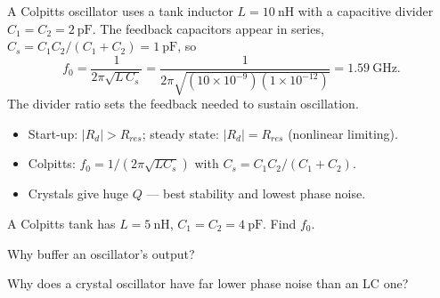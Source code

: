 \begin{workedexample}
A Colpitts oscillator uses a tank inductor $L = 10\ \text{nH}$ with a
capacitive divider $C_1 = C_2 = 2\ \text{pF}$. The feedback capacitors appear in
series, $C_s = C_1C_2/(C_1+C_2) = 1\ \text{pF}$, so
\[ f_0 = \frac{1}{2\pi\sqrt{L\,C_s}} = \frac{1}{2\pi\sqrt{(10\times10^{-9})(1\times10^{-12})}} = 1.59\ \text{GHz}. \]
The divider ratio sets the feedback needed to sustain oscillation.
\end{workedexample}

\begin{keytakeaways}
\begin{itemize}[leftmargin=1.4em,itemsep=2pt]
\item Start-up: $|R_d| > R_{res}$; steady state: $|R_d| = R_{res}$ (nonlinear limiting).
\item Colpitts: $f_0 = 1/(2\pi\sqrt{L C_s})$ with $C_s = C_1C_2/(C_1+C_2)$.
\item Crystals give huge $Q$ --- best stability and lowest phase noise.
\end{itemize}
\end{keytakeaways}

\begin{exercises}
\item A Colpitts tank has $L = 5\ \text{nH}$, $C_1 = C_2 = 4\ \text{pF}$. Find $f_0$.
\item Why buffer an oscillator's output?
\item Why does a crystal oscillator have far lower phase noise than an LC one?
\end{exercises}

